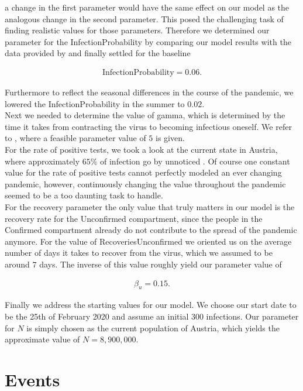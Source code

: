 \documentclass
[
    a4paper,
    11pt,
    bibliography = totoc,
    listof = totoc,
    headinclude = true,
]
{scrreport}
\begin{document}
a change in the first parameter would have the same effect on our model
as the analogous change in the second parameter.
This posed the challenging task of finding realistic values for those parameters.
Therefore we determined our parameter for the InfectionProbability by comparing
our model results with the data provided by \cite{OrfCorona} and finally
settled for the baseline

\begin{align*}
  \text{InfectionProbability} = 0.06.
\end{align*}

Furthermore to reflect the seasonal differences in the course of the pandemic,
we lowered the InfectionProbability in the summer to $0.02$. \\
Next we needed to determine the value of gamma, which is determined by the time
it takes from contracting the virus to becoming infectious oneself.
We refer to \cite{RobertKochInstitut}, where a feasible parameter value of $5$ is given. \\
For the rate of positive tests, we took a look at the current state in Austria,
where approximately $65\%$ of infection go by unnoticed \cite{MassTests}.
Of course one constant value for the rate of positive tests cannot perfectly
modeled an ever changing pandemic, however, continuously changing the value
throughout the pandemic seemed to be a too daunting task to handle. \\
For the recovery parameter the only value that truly matters in our model
is the recovery rate for the Unconfirmed compartment, since the people in the
Confirmed compartment already do not contribute to the spread of the pandemic anymore.
For the value of RecoveriesUnconfirmed we oriented us on the average number of days
it takes to recover from the virus, which we assumed to be around $7$ days.
The inverse of this value roughly yield our parameter value of

\begin{align*}
  \beta_u = 0.15.
\end{align*}

Finally we address the starting values for our model. We choose our start date
to be the 25th of February 2020 and assume an initial 300 infections.
Our parameter for $N$ is simply chosen as the current population of Austria,
which yields the approximate value of $N = 8,900,000$.

\section{Events}
\end{document}
